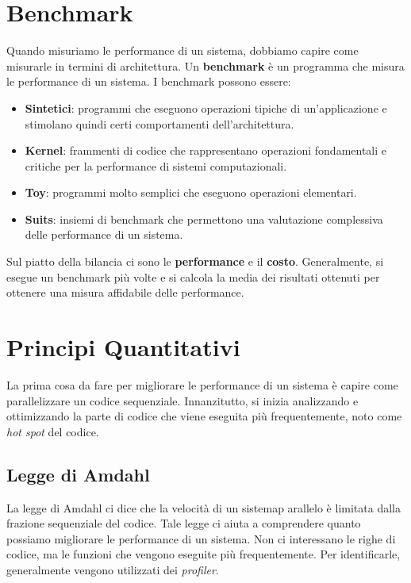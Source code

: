 \section{Benchmark}

Quando misuriamo le performance di un sistema, dobbiamo
capire come misurarle in termini di architettura. Un
\textbf{benchmark} è un programma che misura le
performance di un sistema. I benchmark possono essere:
\begin{itemize}
  \item \textbf{Sintetici}: programmi che eseguono
  operazioni tipiche di un'applicazione e stimolano
  quindi certi comportamenti dell'architettura.
  \item \textbf{Kernel}: frammenti di codice che
  rappresentano operazioni fondamentali e critiche per
  la performance di sistemi computazionali.
  \item \textbf{Toy}: programmi molto semplici che
  eseguono operazioni elementari.
  \item \textbf{Suits}: insiemi di benchmark che
  permettono una valutazione complessiva delle performance
  di un sistema.
\end{itemize}

Sul piatto della bilancia ci sono le \textbf{performance}
e il \textbf{costo}. Generalmente, si esegue un benchmark
più volte e si calcola la media dei risultati ottenuti
per ottenere una misura affidabile delle performance.

\section{Principi Quantitativi}

La prima cosa da fare per migliorare le performance
di un sistema è capire come parallelizzare un codice
sequenziale. Innanzitutto, si inizia analizzando e
ottimizzando la parte di codice che viene eseguita più
frequentemente, noto come \textit{hot spot} del codice.
\subsection{Legge di Amdahl}

La legge di Amdahl ci dice che la velocità di un sistemap
arallelo è limitata dalla frazione sequenziale del codice.
Tale legge ci aiuta a comprendere quanto possiamo
migliorare le performance di un sistema. Non ci
interessano le righe di codice, ma le funzioni che
vengono eseguite più frequentemente. Per identificarle,
generalmente vengono utilizzati dei \textit{profiler}.

